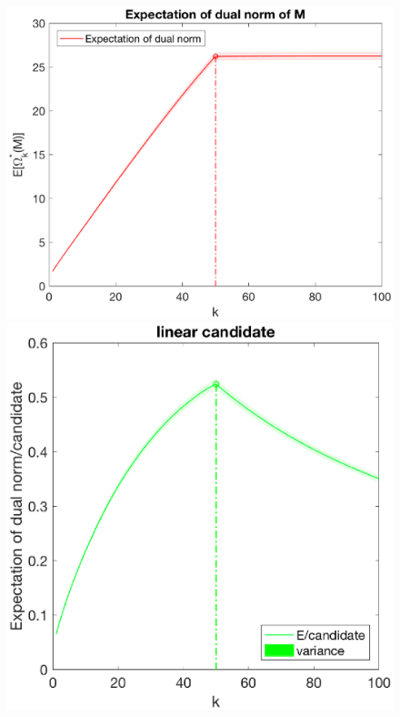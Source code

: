 \documentclass[12pt]{article}
\begin{document}
\begin{figure}[h]
    \begin{minipage}[c]{.3\linewidth}
        \centering
        \includegraphics[width=\linewidth]{Fig/dualnorm-u0ones-k0-50.eps}
    \end{minipage}
    \hfill%
    \begin{minipage}[c]{.3\linewidth}
        \centering
        \includegraphics[width=\linewidth]{Fig/dualnorm-u0ones-k0-50-candidatelin.eps}

\end{minipage}
\end{figure}
\end{document}
